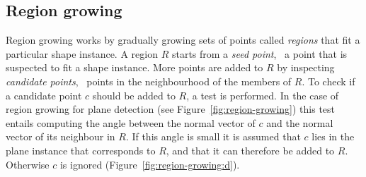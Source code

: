 

\subsection{Region growing}
\label{sec:regiongrowing}
Region growing works by gradually growing sets of points called \emph{regions} that fit a particular shape instance.
A region $R$ starts from a \emph{seed point}, \ie\ a point that is suspected to fit a shape instance.
More points are added to $R$ by inspecting \emph{candidate points}, \ie\ points in the neighbourhood of the members of $R$.
To check if a candidate point $c$ should be added to $R$, a test is performed.
In the case of region growing for plane detection (see Figure~\ref{fig:region-growing}) this test entails computing the angle between the normal vector of $c$ and the normal vector of its neighbour in $R$.
If this angle is small it is assumed that $c$ lies in the plane instance that corresponds to $R$, and that it can therefore be added to $R$.
Otherwise $c$ is ignored (Figure~\ref{fig:region-growing:d}).
